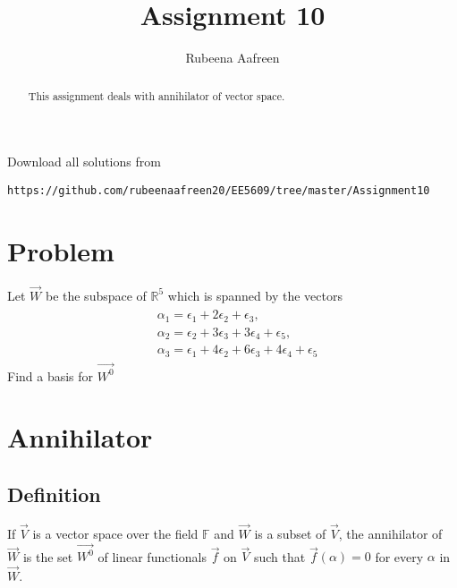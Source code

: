 \documentclass[journal,12pt,twocolumn]{IEEEtran}
\begin{document}
\renewcommand{\thefigure}{\theproblem}
\def\putbox#1#2#3{\makebox[0in][l]{\makebox[#1][l]{}\raisebox{\baselineskip}[0in][0in]{\raisebox{#2}[0in][0in]{#3}}}}
     \def\rightbox#1{\makebox[0in][r]{#1}}
     \def\centbox#1{\makebox[0in]{#1}}
     \def\topbox#1{\raisebox{-\baselineskip}[0in][0in]{#1}}
     \def\midbox#1{\raisebox{-0.5\baselineskip}[0in][0in]{#1}}
\vspace{3cm}
\title{Assignment 10}
\author{Rubeena Aafreen}
\maketitle
\newpage
\bigskip
\renewcommand{\thefigure}{\theenumi}
\renewcommand{\thetable}{\theenumi}
\begin{abstract}
This assignment deals with annihilator of vector space.
\end{abstract}
Download  all solutions from 
\begin{lstlisting}
https://github.com/rubeenaafreen20/EE5609/tree/master/Assignment10
\end{lstlisting}
\section{Problem}
Let $\vec{W}$ be the subspace of $\mathbb{R}^5$ which is spanned by the vectors  
   \begin{multline}
    \begin{aligned}
    &\alpha_1=\epsilon_1+2\epsilon_2+\epsilon_3,\\ &\alpha_2=\epsilon_2+3\epsilon_3+3\epsilon_4+\epsilon_5,\\&\alpha_3=\epsilon_1+4\epsilon_2+6\epsilon_3+4\epsilon_4+\epsilon_5
    \end{aligned}
    \end{multline}
    Find a basis for $\vec{W^0}$
\section{Annihilator}
\subsection{Definition}
 If $\vec{V}$ is a vector space over the field $\mathbb{F}$ and $\vec{W}$ is a subset of $\vec{V}$, the annihilator of $\vec{W}$ is the set $\vec{W^0}$ of linear functionals $\vec{f}$ on $\vec{V}$ such that $\vec{f}(\alpha)=0$ for every $\alpha$ in $\vec{W}$.
\end{document}
